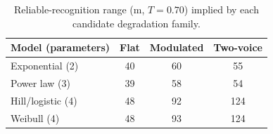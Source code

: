 \begin{table}[H]
\centering
\caption{Reliable-recognition range (m, $T=0.70$) implied by each candidate degradation family.}
\label{tab:p2mf}
\small
\begin{tabular}{lccc}
\toprule
Model (parameters) & Flat & Modulated & Two-voice \\
\midrule
Exponential (2) & 40 & 60 & 55 \\
Power law (3) & 39 & 58 & 54 \\
Hill/logistic (4) & 48 & 92 & 124 \\
Weibull (4) & 48 & 93 & 124 \\
\bottomrule
\end{tabular}
\end{table}